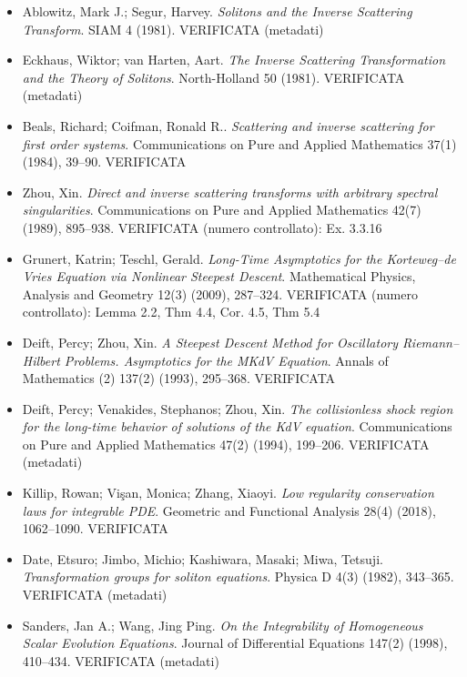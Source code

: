 \begin{itemize}[itemsep=2pt,leftmargin=1.2em,font=\small]
\item Ablowitz, Mark J.; Segur, Harvey. \emph{Solitons and the Inverse Scattering Transform}. SIAM 4 (1981). \textsf{\footnotesize VERIFICATA (metadati)}
\item Eckhaus, Wiktor; van Harten, Aart. \emph{The Inverse Scattering Transformation and the Theory of Solitons}. North-Holland 50 (1981). \textsf{\footnotesize VERIFICATA (metadati)}
\item Beals, Richard; Coifman, Ronald R.. \emph{Scattering and inverse scattering for first order systems}. Communications on Pure and Applied Mathematics 37(1) (1984), 39--90. \textsf{\footnotesize VERIFICATA}
\item Zhou, Xin. \emph{Direct and inverse scattering transforms with arbitrary spectral singularities}. Communications on Pure and Applied Mathematics 42(7) (1989), 895--938. \textsf{\footnotesize VERIFICATA (numero controllato): Ex. 3.3.16}
\item Grunert, Katrin; Teschl, Gerald. \emph{Long-Time Asymptotics for the {K}orteweg--de {V}ries Equation via Nonlinear Steepest Descent}. Mathematical Physics, Analysis and Geometry 12(3) (2009), 287--324. \textsf{\footnotesize VERIFICATA (numero controllato): Lemma 2.2, Thm 4.4, Cor. 4.5, Thm 5.4}
\item Deift, Percy; Zhou, Xin. \emph{A Steepest Descent Method for Oscillatory {R}iemann--{H}ilbert Problems. {A}symptotics for the {MKdV} Equation}. Annals of Mathematics (2) 137(2) (1993), 295--368. \textsf{\footnotesize VERIFICATA}
\item Deift, Percy; Venakides, Stephanos; Zhou, Xin. \emph{The collisionless shock region for the long-time behavior of solutions of the {KdV} equation}. Communications on Pure and Applied Mathematics 47(2) (1994), 199--206. \textsf{\footnotesize VERIFICATA (metadati)}
\item Killip, Rowan; Vi{\c s}an, Monica; Zhang, Xiaoyi. \emph{Low regularity conservation laws for integrable {PDE}}. Geometric and Functional Analysis 28(4) (2018), 1062--1090. \textsf{\footnotesize VERIFICATA}
\item Date, Etsuro; Jimbo, Michio; Kashiwara, Masaki; Miwa, Tetsuji. \emph{Transformation groups for soliton equations}. Physica D 4(3) (1982), 343--365. \textsf{\footnotesize VERIFICATA (metadati)}
\item Sanders, Jan A.; Wang, Jing Ping. \emph{On the Integrability of Homogeneous Scalar Evolution Equations}. Journal of Differential Equations 147(2) (1998), 410--434. \textsf{\footnotesize VERIFICATA (metadati)}

\end{itemize}
